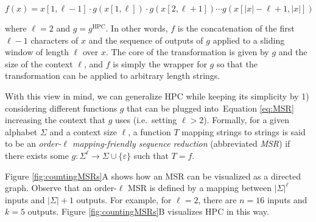 \documentclass[
  11,
]{scrbook}
\begin{document}
\begin{equation}
  f(x) = x[1,\ell-1]\cdot g(x[1,\ell]) \cdot g(x[2, \ell+1])\cdots g(x[|x|-\ell+1,|x|]) 
  \label{eq:MSR}
\end{equation}

where \(\ell = 2\) and \(g=g^\text{HPC}\). In other
words, \(f\) is the concatenation of the first \(\ell-1\) characters of \(x\)
and the sequence of outputs of \(g\) applied to a sliding window of length
\(\ell\) over \(x\). The core of the transformation is given by \(g\) and the
size of the context \(\ell\), and \(f\) is simply the wrapper for \(g\) so
that the transformation can be applied to arbitrary length strings.

With this view in mind, we can generalize HPC while keeping its
simplicity by 1) considering different functions \(g\) that can be plugged
into~Equation \eqref{eq:MSR} increasing the context that \(g\) uses (i.e.~setting \(\ell>2\)).
Formally, for a given alphabet \(\Sigma\) and a context size \(\ell\), a
function \(T\) mapping strings to strings is said to be an \emph{order-\(\ell\)
mapping-friendly sequence reduction} (abbreviated \emph{MSR}) if there exists
some \(g : \Sigma^\ell\rightarrow\Sigma\cup\{\varepsilon\}\) such that
\(T=f\).

Figure \ref{fig:countingMSRs}A shows how an MSR can be visualized as a
directed graph. Observe that an order-\(\ell\) MSR is defined by a mapping
between \(|\Sigma|^\ell\) inputs and \(|\Sigma| + 1\) outputs. For example,
for \(\ell=2\), there are \(n=16\) inputs and \(k=5\) outputs.
Figure \ref{fig:countingMSRs}B visualizes HPC in this way.
\end{document}
